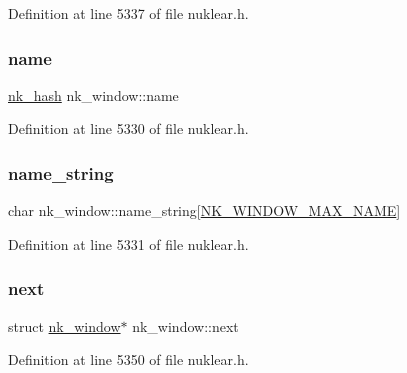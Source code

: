 Definition at line 5337 of file nuklear.\+h.

\mbox{\label{structnk__window_afdb4b90e7f28cfec870cb349a5161ebc}} 
\subsubsection{\texorpdfstring{name}{name}}
{\footnotesize\ttfamily \mbox{\hyperlink{nuklear_8h_a2123e2728db7d1f136b57d6528a0d757}{nk\+\_\+hash}} nk\+\_\+window\+::name}



Definition at line 5330 of file nuklear.\+h.

\mbox{\label{structnk__window_a5fbe50f169aa47cab86ebef31e43047a}} 
\subsubsection{\texorpdfstring{name\+\_\+string}{name\_string}}
{\footnotesize\ttfamily char nk\+\_\+window\+::name\+\_\+string\mbox{[}\mbox{\hyperlink{nuklear_8h_ae8c2d8ba66b02fdd1c64137904c83372}{N\+K\+\_\+\+W\+I\+N\+D\+O\+W\+\_\+\+M\+A\+X\+\_\+\+N\+A\+ME}}\mbox{]}}



Definition at line 5331 of file nuklear.\+h.

\mbox{\label{structnk__window_a43d9992fd6f4b1e86a325e099b7e49fa}} 
\subsubsection{\texorpdfstring{next}{next}}
{\footnotesize\ttfamily struct \mbox{\hyperlink{structnk__window}{nk\+\_\+window}}$\ast$ nk\+\_\+window\+::next}



Definition at line 5350 of file nuklear.\+h.

\mbox{\label{structnk__window_ade4eb319bf6471423d5d123a637f37c1}} 
